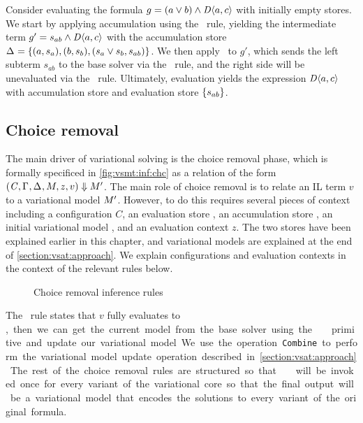 Consider evaluating the formula $g=(a\vee b)\wedge\chc[D]{a,c}$ with initially
empty stores. We start by applying accumulation using the \evAcc\ rule,
yielding the intermediate term $g'=s_{ab}\wedge\chc[D]{a,c}$ with the
accumulation store $\aStore{}=\set{(a,s_a),(b,s_b),(s_a \vee s_b,s_{ab})}$. We
then apply \evAndL\ to $g'$, which sends the left subterm $s_{ab}$ to the base
solver via the \evSym\ rule, and the right side will be unevaluated via the
\evChc\ rule.
%
Ultimately, evaluation yields the expression $\chc[D]{a,c}$ with accumulation
store \aStore{} and evaluation store $\set{s_{ab}}$.


\subsection{Choice removal}
%
The main driver of variational solving is the choice removal phase, which is
formally specificed in \autoref{fig:vsmt:inf:chc} as a relation of the form
$(\mathit{C}{},\Gamma_{},\Delta_{},M_{},z,v)\Downarrow M_{}'$.
%
The main role of choice removal is to relate an IL term $v$ to a variational
model $M_{}'$. However, to do this requires several pieces of context
including a configuration $C$, an evaluation store \eStore{}, an accumulation
store \aStore{}, an initial variational model \vmodel{}, and an evaluation
context $z$. The two stores have been explained earlier in this chapter, and
variational models are explained at the end of \autoref{section:vsat:approach}.
We explain configurations and evaluation contexts in the context of the relevant
rules below.


\begin{figure}
  
  \caption{Choice removal inference rules}%
  \label{fig:vsmt:inf:chc}
\end{figure}


The \crEval\ rule states that $v$ fully evaluates to \unit, then we can get the
current model from the base solver using the \pmodel\ primitive and update our
variational model. We use the operation \texttt{Combine} to perform the
variational model update operation described in \autoref{section:vsat:approach}.
%
The rest of the choice removal rules are structured so that \crEval\ will be
invoked once for every variant of the variational core so that the final output
will be a variational model that encodes the solutions to every variant of the
original formula.


